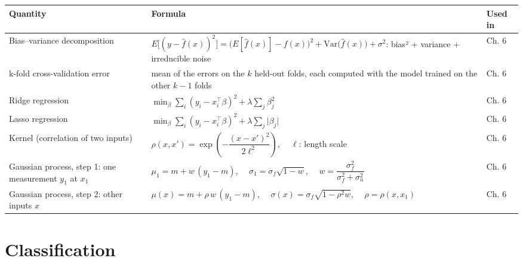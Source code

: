 \documentclass[
  letterpaper,
  DIV=11,
  numbers=noendperiod]{scrreprt}
\begin{document}
\begin{longtable}[]{@{}
  >{\raggedright\arraybackslash}p{}
  >{\raggedright\arraybackslash}p{}
  >{\raggedright\arraybackslash}p{}@{}}
\toprule\noalign{}
\begin{minipage}[b]{\linewidth}\raggedright
Quantity
\end{minipage} & \begin{minipage}[b]{\linewidth}\raggedright
Formula
\end{minipage} & \begin{minipage}[b]{\linewidth}\raggedright
Used in
\end{minipage} \\
\midrule\noalign{}
\endhead
\bottomrule\noalign{}
\endlastfoot
Bias--variance decomposition &
\(E\big[(y - \hat f(x))^2\big] = \big(E[\hat f(x)] - f(x)\big)^2 + \text{Var}\big(\hat f(x)\big) + \sigma^2\):
bias² + variance + irreducible noise & Ch. 6 \\
k-fold cross-validation error & mean of the errors on the \(k\) held-out
folds, each computed with the model trained on the other \(k - 1\) folds
& Ch. 6 \\
Ridge regression &
\(\min_\beta \sum_i (y_i - x_i^\top\beta)^2 + \lambda \sum_j \beta_j^2\)
& Ch. 6 \\
Lasso regression &
\(\min_\beta \sum_i (y_i - x_i^\top\beta)^2 + \lambda \sum_j \lvert\beta_j\rvert\)
& Ch. 6 \\
Kernel (correlation of two inputs) &
\(\rho(x, x') = \exp\left(-\dfrac{(x - x')^2}{2\ell^2}\right)\),
\(\quad \ell\): length scale & Ch. 6 \\
Gaussian process, step 1: one measurement \(y_1\) at \(x_1\) &
\(\mu_1 = m + w\,(y_1 - m)\), \(\quad \sigma_1 = \sigma_f\sqrt{1 - w}\),
\(\quad w = \dfrac{\sigma_f^2}{\sigma_f^2 + \sigma_n^2}\) & Ch. 6 \\
Gaussian process, step 2: other inputs \(x\) &
\(\mu(x) = m + \rho\,w\,(y_1 - m)\),
\(\quad \sigma(x) = \sigma_f\sqrt{1 - \rho^2 w}\),
\(\quad \rho = \rho(x, x_1)\) & Ch. 6 \\
\end{longtable}

\section{Classification}\label{classification-1}
\end{document}
